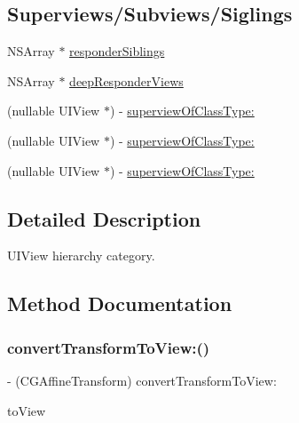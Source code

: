 \subsection*{Superviews/\+Subviews/\+Siglings}
\label{_amgrpd28970ce5f3c9bce84da6989bb43c464}%


 

 \begin{DoxyCompactItemize}
\item 
N\+S\+Array $\ast$ \mbox{\hyperlink{category_u_i_view_07_i_q___u_i_view___hierarchy_08_a92b4177ff2ee2bb698fa09992982693b}{responder\+Siblings}}
\item 
N\+S\+Array $\ast$ \mbox{\hyperlink{category_u_i_view_07_i_q___u_i_view___hierarchy_08_a56509a896c8092f98f04a8ef3f6019c8}{deep\+Responder\+Views}}
\item 
(nullable U\+I\+View $\ast$) -\/ \mbox{\hyperlink{category_u_i_view_07_i_q___u_i_view___hierarchy_08_aee84ba86eeb666e0634ae7d38c73335a}{superview\+Of\+Class\+Type\+:}}
\item 
(nullable U\+I\+View $\ast$) -\/ \mbox{\hyperlink{category_u_i_view_07_i_q___u_i_view___hierarchy_08_aee84ba86eeb666e0634ae7d38c73335a}{superview\+Of\+Class\+Type\+:}}
\item 
(nullable U\+I\+View $\ast$) -\/ \mbox{\hyperlink{category_u_i_view_07_i_q___u_i_view___hierarchy_08_aee84ba86eeb666e0634ae7d38c73335a}{superview\+Of\+Class\+Type\+:}}
\end{DoxyCompactItemize}


\subsection{Detailed Description}
U\+I\+View hierarchy category. 

\subsection{Method Documentation}
\mbox{\label{category_u_i_view_07_i_q___u_i_view___hierarchy_08_a5f2253e4faeb705df233def7eaa6605e}} 
\subsubsection{\texorpdfstring{convert\+Transform\+To\+View\+:()}{convertTransformToView:()}\hspace{0.1cm}{\footnotesize\ttfamily [1/3]}}
{\footnotesize\ttfamily -\/ (C\+G\+Affine\+Transform) convert\+Transform\+To\+View\+: \begin{DoxyParamCaption}\item[{(nullable U\+I\+View $\ast$)}]{to\+View }\end{DoxyParamCaption}}

